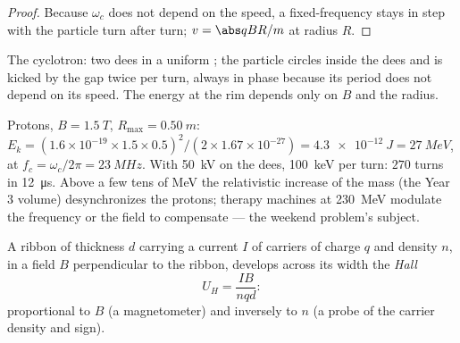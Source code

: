 \begin{proof}
Because $\omega_c$ does not depend on the speed, a fixed-frequency 
stays in step with the particle turn after turn; $v = \abs qBR/m$ at radius
$R$.
\end{proof}

\begin{omfigure}

{\small The cyclotron: two dees in a uniform ; the
particle circles inside the dees and is kicked by the gap  twice
per turn, always in phase because its period does not depend on its
speed. The energy at the rim depends only on $B$ and the radius.}
\end{omfigure}

\begin{example}\label{ex:b1:charged-particles:medical}
Protons, $B = \qty{1.5}{T}$, $R_{\max} = \qty{0.50}{m}$: $E_k =
(1.6\times10^{-19} \times 1.5 \times 0.5)^2/(2 \times 1.67\times10^{-27}) =
\qty{4.3e-12}{J} = \qty{27}{MeV}$, at $f_c = \omega_c/2\pi = \qty{23}{MHz}$.
With \qty{50}{kV} on the dees, \qty{100}{keV} per turn: $270$ turns in
\qty{12}{\micro s}. Above a few tens of MeV the relativistic increase of
the mass (the Year 3 volume) desynchronizes the protons; therapy machines
at \qty{230}{MeV} modulate the frequency or the field to compensate ---
the weekend problem's subject.
\end{example}

\begin{proposition}\label{prop:b1:charged-particles:hall}
A ribbon of thickness $d$ carrying a current $I$ of carriers of charge
$q$ and density $n$, in a field $B$ perpendicular to the ribbon,
develops across its width the \emph{Hall }
\[
U_H = \frac{IB}{nqd} :
\]
proportional to $B$ (a magnetometer) and inversely to $n$ (a probe of
the carrier density and sign).
\end{proposition}

